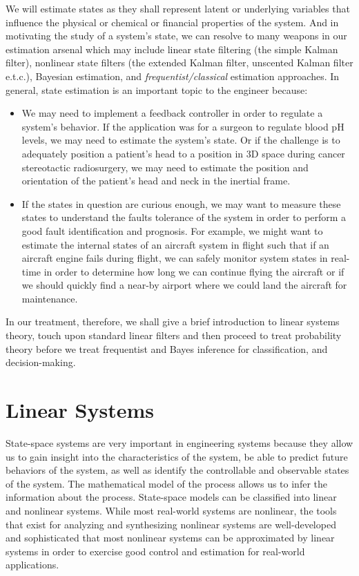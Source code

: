 We will estimate states as they shall represent latent or underlying variables that influence the physical or chemical or financial properties of the system. And in motivating the study of a system's state, we can resolve to many weapons in our estimation arsenal which may include linear state filtering (the simple Kalman filter), nonlinear state filters (the extended Kalman filter, unscented Kalman filter e.t.c.), Bayesian estimation, and \textit{frequentist/classical} estimation approaches. In general, state estimation is an important topic to the engineer because:
%
\begin{itemize}
	\item We may need to implement a feedback controller in order to regulate a system's behavior. If the application was for a surgeon to regulate blood pH levels, we may need to estimate the system's state. Or if the challenge is to adequately position a patient's head to a position in 3D space during cancer stereotactic radiosurgery, we may need to estimate the position and orientation of the patient's head and neck in the inertial frame.
	\item If the states in question are curious enough, we may want to measure these states to understand the faults tolerance of the system in order to perform a good fault identification and prognosis. For example, we might want to estimate the internal states of an aircraft system in flight such that if an aircraft engine fails during flight, we can safely monitor system states in real-time in order to determine how long we can continue flying the aircraft or if we should quickly find a near-by airport where we could land the aircraft for maintenance.
\end{itemize} 
%
In our treatment, therefore, we shall give a brief introduction to linear systems theory, touch upon standard linear filters and then proceed to treat probability theory before we treat frequentist and Bayes inference for classification, and decision-making.

\section{Linear Systems}

State-space systems are very important in engineering systems because they allow us to gain insight into the characteristics of the system, be able to predict future behaviors of the system, as well as identify the controllable and observable states of the system. The mathematical model of the process allows us to infer the information about the process. State-space models can be classified into linear and nonlinear systems. While most real-world systems are nonlinear, the tools that exist for analyzing and synthesizing nonlinear systems  are well-developed and sophisticated that most nonlinear systems can be approximated by linear systems in order to exercise good control and estimation for real-world applications.

